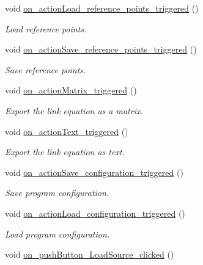 \begin{CompactItemize}
void \hyperlink{class_main_window_ab69ed6062314eb01e1da040c25fb729}{on\_\-actionLoad\_\-reference\_\-points\_\-triggered} ()
\begin{CompactList}\small\item\em Load reference points. \item\end{CompactList}\item 
void \hyperlink{class_main_window_5043d479476d86d34de793756dee7f90}{on\_\-actionSave\_\-reference\_\-points\_\-triggered} ()
\begin{CompactList}\small\item\em Save reference points. \item\end{CompactList}\item 
void \hyperlink{class_main_window_512962db92632ebe41675384cb173c4c}{on\_\-actionMatrix\_\-triggered} ()
\begin{CompactList}\small\item\em Export the link equation as a matrix. \item\end{CompactList}\item 
void \hyperlink{class_main_window_c2debfac33d16643a090b07af894d6db}{on\_\-actionText\_\-triggered} ()
\begin{CompactList}\small\item\em Export the link equation as text. \item\end{CompactList}\item 
void \hyperlink{class_main_window_d4bdb52229e3a87a86a011875dd92236}{on\_\-actionSave\_\-configuration\_\-triggered} ()
\begin{CompactList}\small\item\em Save program configuration. \item\end{CompactList}\item 
void \hyperlink{class_main_window_07acca6e47a3a539159c867261d0e640}{on\_\-actionLoad\_\-configuration\_\-triggered} ()
\begin{CompactList}\small\item\em Load program configuration. \item\end{CompactList}\item 
void \hyperlink{class_main_window_86b907774ebb8fb294e443f25526e7df}{on\_\-pushButton\_\-LoadSource\_\-clicked} ()
\item 

\end{CompactItemize}

